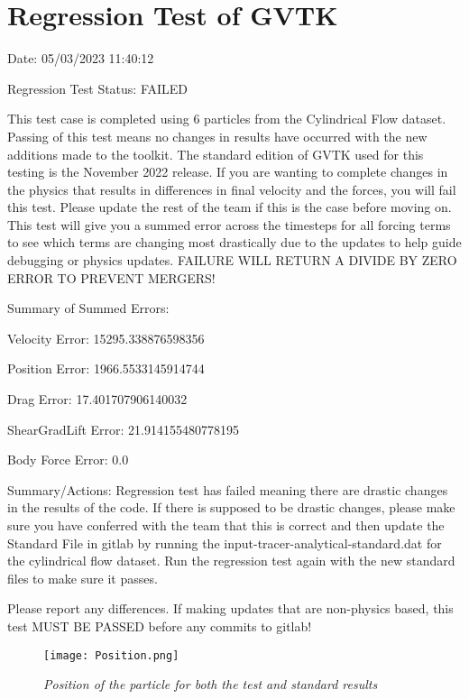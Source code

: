 \documentclass{article}
\begin{document}
\section{Regression Test of GVTK}
Date: 05/03/2023 11:40:12

\vspace{5pt}

\noindent Regression Test Status: FAILED

\vspace{5pt}

\noindent This test case is completed using 6 particles from the Cylindrical Flow dataset. Passing of this test means no changes in results have occurred with the new additions made to the toolkit.
The standard edition of GVTK used for this testing is the November 2022 release. If you are wanting to complete changes in the physics that results in differences in final velocity and the forces,
you will fail this test. Please update the rest of the team if this is the case before moving on. This test will give you a summed error across the timesteps for all forcing terms to see which terms
are changing most drastically due to the updates to help guide debugging or physics updates. FAILURE WILL RETURN A DIVIDE BY ZERO ERROR TO PREVENT MERGERS!



\vspace{5pt}

\noindent Summary of Summed Errors:
\vspace{5pt}

Velocity Error: 15295.338876598356

Position Error: 1966.5533145914744

Drag Error: 17.401707906140032

ShearGradLift Error: 21.914155480778195

Body Force Error: 0.0

\vspace{5pt}

\noindent Summary/Actions: Regression test has failed meaning there are drastic changes in the results of the code. 
If there is supposed to be drastic changes, please make sure you have conferred with the team that this is correct and then update the Standard File in gitlab by running the input-tracer-analytical-standard.dat for the cylindrical flow dataset.
Run the regression test again with the new standard files to make sure it passes.

\vspace{5pt}

\noindent Please report any differences. If making updates that are non-physics based, this test MUST BE PASSED before any commits to gitlab!

\begin{figure}[htbp]
\centering
\texttt{[image: Position.png]}
\caption{\textit{Position of the particle for both the test and standard results}}
\label{fig:postion}
\end{figure}
\end{document}
